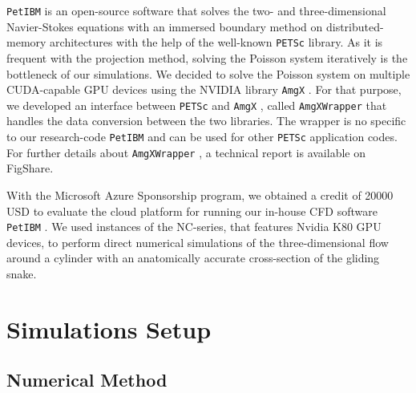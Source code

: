 \documentclass[12pt]{article}
\newcommand{\petibm}{\texttt{PetIBM} }
\newcommand{\petsc}{\texttt{PETSc} }
\newcommand{\amgx}{\texttt{AmgX} }
\newcommand{\amgxwrapper}{\texttt{AmgXWrapper} }
\begin{document}
\petibm is an open-source software that solves the two- and three-dimensional Navier-Stokes equations with an immersed boundary method on distributed-memory architectures with the help of the well-known \petsc library\cite{PETSc_webpage_2017,PETSc_users_manual_2017,Balay_et_al_1997}.
As it is frequent with the projection method, solving the Poisson system iteratively is the bottleneck of our simulations.
We decided to solve the Poisson system on multiple CUDA-capable GPU devices using the NVIDIA library \amgx\cite{Naumov_et_al_2015, Nvidia_AmgX_webpage}.
For that purpose, we developed an interface between \petsc and \amgx, called \amgxwrapper\cite{Chuang_Barba_2017} that handles the data conversion between the two libraries.
The wrapper is no specific to our research-code \petibm and can be used for other \petsc application codes.
For further details about \amgxwrapper, a technical report is available on FigShare\cite{Chuang_Barba_2017_b}.

With the Microsoft Azure Sponsorship program, we obtained a credit of 20000 USD to evaluate the cloud platform for running our in-house CFD software \petibm.
We used instances of the NC-series, that features Nvidia K80 GPU devices, to perform direct numerical simulations of the three-dimensional flow around a cylinder with an anatomically accurate cross-section of the gliding snake.


\section{Simulations Setup}

\subsection{Numerical Method}
\end{document}
